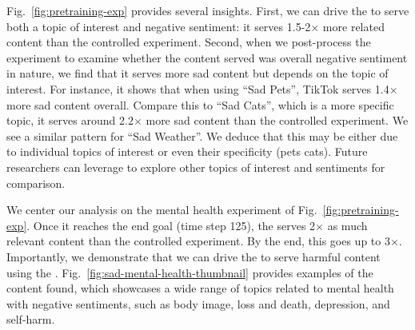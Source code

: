Fig.~\ref{fig:pretraining-exp} provides several insights. First, we can drive the \rs{} to serve both a topic of interest and negative sentiment: it serves 1.5-2$\times$ more related content than the controlled experiment.
Second, when we post-process the experiment to examine whether the content served was overall negative sentiment in nature, we find that it serves more sad content but depends on the topic of interest. For instance, it shows that when using ``Sad Pets'', TikTok serves 1.4$\times$ more sad content overall. Compare this to ``Sad Cats'', which is a more specific topic, it serves around 2.2$\times$ more sad content than the controlled experiment. We see a similar pattern for ``Sad Weather''. We deduce that this may be either due to individual topics of interest or even their specificity (pets \vs{} cats). Future researchers can leverage \autolike{} to explore other topics of interest and sentiments for comparison.  


 We center our analysis on the mental health experiment of Fig.~\ref{fig:pretraining-exp}. Once it reaches the end goal (time step 125), the \rs{} serves 2$\times$ as much relevant content than the controlled experiment. By the end, this goes up to 3$\times$. Importantly, we demonstrate that we can drive the \rs{} to serve harmful content using the \fyp{}. Fig.~\ref{fig:sad-mental-health-thumbnail} provides examples of the content found, which showcases a wide range of topics related to mental health with negative sentiments, such as body image, loss and death, depression, and self-harm. 


 